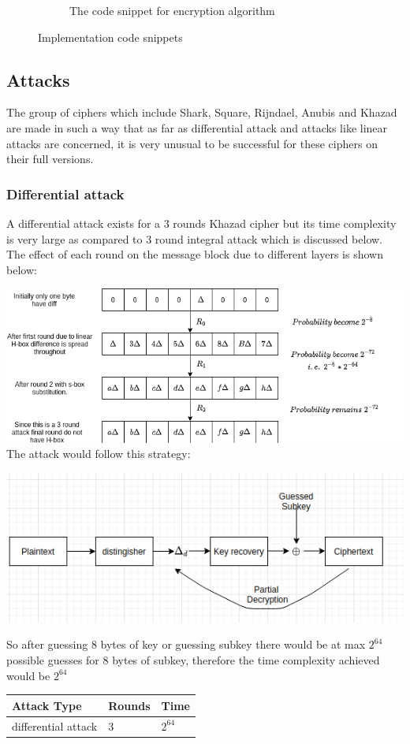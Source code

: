 \documentclass[preprint]{transcrypto}
\begin{document}
\begin{figure}[H]
\begin{subfigure}{.5\textwidth}
			\caption{The code snippet for encryption algorithm}
			\label{fig:sub-third}
		\end{subfigure}
		\caption{Implementation code snippets}
		\label{fig:fig:fig}
	\end{figure}
\subsection{Attacks} 
The group of ciphers which include Shark, Square, Rijndael,
Anubis and Khazad are made in such a way that
as far as differential attack and attacks like linear attacks are concerned, it is very unusual
to be successful for these ciphers on their full versions.
\subsubsection{Differential attack}
A differential attack exists for a 3 rounds Khazad cipher but its time complexity is very large as compared to 3 round integral attack which is discussed below. The effect of each round on the message block due to different layers is shown below:\\
\begin{center}
    \includegraphics[scale=0.6]{Screenshots/diffat.png} \\
    The attack would follow this strategy:
\end{center}
\begin{center}
    \includegraphics[scale=0.5]{Screenshots/pd.png}
\end{center}
So after guessing 8 bytes of key or guessing subkey there would be at max $2^{64}$ possible guesses for 8 bytes of subkey, therefore the time complexity achieved would be $2^{64}$
\begin{table}[h]
\centering
\begin{tabular}{|l|l|l|}
\hline
Attack Type     & Rounds & Time     \\ \hline
differential attack & 3      & $2^{64}$  \\ \hline
\end{tabular}
\end{table} 
\newpage
\end{document}
